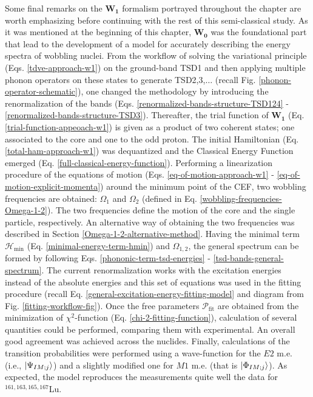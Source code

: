 Some final remarks on the $\mathbf{W_1}$ formalism portrayed throughout the chapter are worth emphasizing before continuing with the rest of this semi-classical study. As it was mentioned at the beginning of this chapter, $\mathbf{W_0}$ was the foundational part that lead to the development of a model for accurately describing the energy spectra of wobbling nuclei. From the workflow of solving the variational principle (Eqs. \ref{tdve-approach-w1}) on the ground-band TSD1 and then applying multiple phonon operators on these states to generate TSD2,3,$\dots$ (recall Fig. \ref{phonon-operator-schematic}), one changed the methodology by introducing the renormalization of the bands (Eqs. \ref{renormalized-bands-structure-TSD124} - \ref{renormalized-bands-structure-TSD3}). Thereafter, the trial function  of $\mathbf{W_1}$ (Eq. \ref{trial-function-appeoach-w1}) is given as a product of two coherent states; one associated to the core and one to the odd proton. The initial Hamiltonian (Eq. \ref{total-ham-approach-w1}) was dequantized and the Classical Energy Function emerged (Eq. \ref{full-classical-energy-function}). Performing a linearization procedure of the equations of motion (Eqs. \ref{eq-of-motion-approach-w1} - \ref{eq-of-motion-explicit-momenta}) around the minimum point of the CEF, two wobbling frequencies are obtained: $\Omega_1$ and $\Omega_2$ (defined in Eq. \ref{wobbling-frequencies-Omega-1-2}). The two frequencies define the motion of the core and the single particle, respectively. An alternative way of obtaining the two frequencies was described in Section \ref{Omega-1-2-alternative-method}. Having the minimal term $\mathcal{H}_\text{min}$ (Eq. \ref{minimal-energy-term-hmin}) and $\Omega_{1,2}$, the general spectrum can be formed by following Eqs. \ref{phononic-term-tsd-energies} - \ref{tsd-bands-general-spectrum}. The current renormalization works with the excitation energies instead of the absolute energies and this set of equations was used in the fitting procedure (recall Eq. \ref{general-excitation-energy-fitting-model} and diagram from Fig. \ref{fitting-workflow-fig}). Once the free parameters $\mathcal{P}_\text{fit}$ are obtained from the minimization of $\chi^2$-function (Eq. \ref{chi-2-fitting-function}), calculation of several quantities could be performed, comparing them with experimental. An overall good agreement was achieved across the nuclides. Finally, calculations of the transition probabilities were performed using a wave-function for the $E2$ m.e. (i.e., $\ket{\Psi_{IM;j}}$) and a slightly modified one for $M1$ m.e. (that is $\ket{\Phi_{IM;j}}$). As expected, the model reproduces the measurements quite well the data for $^{161,163,165,167}$Lu.

